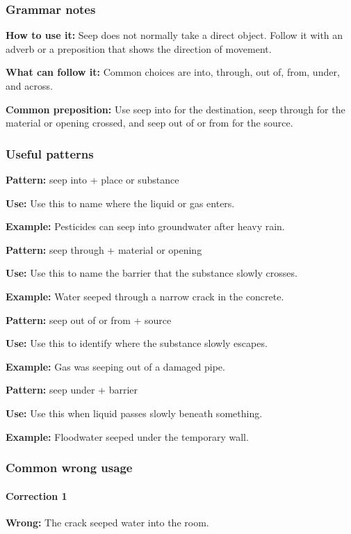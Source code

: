 \documentclass[11pt]{article}
\begin{document}
\subsubsection{Grammar notes}
\textbf{How to use it:} Seep does not normally take a direct object. Follow it with an adverb or a preposition that shows the direction of movement.

\textbf{What can follow it:} Common choices are into, through, out of, from, under, and across.

\textbf{Common preposition:} Use seep into for the destination, seep through for the material or opening crossed, and seep out of or from for the source.

\subsubsection{Useful patterns}
\textbf{Pattern:} seep into + place or substance

\textbf{Use:} Use this to name where the liquid or gas enters.

\textbf{Example:} Pesticides can seep into groundwater after heavy rain.

\textbf{Pattern:} seep through + material or opening

\textbf{Use:} Use this to name the barrier that the substance slowly crosses.

\textbf{Example:} Water seeped through a narrow crack in the concrete.

\textbf{Pattern:} seep out of or from + source

\textbf{Use:} Use this to identify where the substance slowly escapes.

\textbf{Example:} Gas was seeping out of a damaged pipe.

\textbf{Pattern:} seep under + barrier

\textbf{Use:} Use this when liquid passes slowly beneath something.

\textbf{Example:} Floodwater seeped under the temporary wall.

\subsubsection{Common wrong usage}
\paragraph{Correction 1}
\textbf{Wrong:} The crack seeped water into the room.
\end{document}
